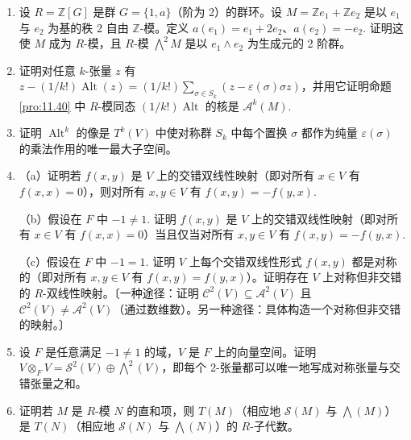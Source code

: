 \begin{enumerate}
（c）给出一个整环 \(R\) 与 \(F\) 中的 \(R\)-模 \(I\) 的例子，使对每个 \(i \geq 0\) 有 \(\bigwedge^i I \neq 0\)（参见推论 \ref{cor:11.37} 之后的例子）。

\item 设 \(R = \mathbb{Z}[G]\) 是群 \(G = \{1, a\}\)（阶为 2）的群环。设 \(M = \mathbb{Z}e_1+\mathbb{Z}e_2\) 是以 \(e_1\) 与 \(e_2\) 为基的秩 2 自由 \(\mathbb{Z}\)-模。定义 \(a(e_1) = e_1+2e_2\)、\(a(e_2) = -e_2\). 证明这使 \(M\) 成为 \(R\)-模，且 \(R\)-模 \(\bigwedge^2 M\) 是以 \(e_1 \wedge e_2\) 为生成元的 2 阶群。

\item 证明对任意 \(k\)-张量 \(z\) 有 \(z-(1/k!)\operatorname{Alt}(z) = (1/k!)\sum_{\sigma \in S_k}(z-\varepsilon(\sigma)\sigma z)\)，并用它证明命题 \ref{pro:11.40} 中 \(R\)-模同态 \((1/k!)\operatorname{Alt}\) 的核是 \(\mathcal{A}^k(M)\).

\item 证明 \(\operatorname{Alt}^k\) 的像是 \(T^k(V)\) 中使对称群 \(S_k\) 中每个置换 \(\sigma\) 都作为纯量 \(\varepsilon(\sigma)\) 的乘法作用的唯一最大子空间。

\item （a）证明若 \(f(x, y)\) 是 \(V\) 上的交错双线性映射（即对所有 \(x \in V\) 有 \(f(x, x) = 0\)），则对所有 \(x, y \in V\) 有 \(f(x, y) = -f(y, x)\).

（b）假设在 \(F\) 中 \(-1 \neq 1\). 证明 \(f(x, y)\) 是 \(V\) 上的交错双线性映射（即对所有 \(x \in V\) 有 \(f(x, x) = 0\)）当且仅当对所有 \(x, y \in V\) 有 \(f(x, y) = -f(y, x)\).

（c）假设在 \(F\) 中 \(-1 = 1\). 证明 \(V\) 上每个交错双线性形式 \(f(x, y)\) 都是对称的（即对所有 \(x, y \in V\) 有 \(f(x, y) = f(y, x)\)）。证明存在 \(V\) 上对称但非交错的 \(R\)-双线性映射。〔一种途径：证明 \(\mathcal{C}^2(V) \subseteq \mathcal{A}^2(V)\) 且 \(\mathcal{C}^2(V) \neq \mathcal{A}^2(V)\)（通过数维数）。另一种途径：具体构造一个对称但非交错的映射。〕

\item 设 \(F\) 是任意满足 \(-1 \neq 1\) 的域，\(V\) 是 \(F\) 上的向量空间。证明 \(V \otimes_F V = \mathcal{S}^2(V) \oplus \bigwedge^2(V)\)，即每个 2-张量都可以唯一地写成对称张量与交错张量之和。

\item 证明若 \(M\) 是 \(R\)-模 \(N\) 的直和项，则 \(T(M)\)（相应地 \(\mathcal{S}(M)\) 与 \(\bigwedge(M)\)）是 \(T(N)\)（相应地 \(\mathcal{S}(N)\) 与 \(\bigwedge(N)\)）的 \(R\)-子代数。
\end{enumerate}
